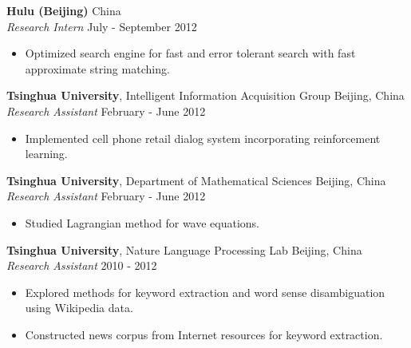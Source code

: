 \documentclass[a4paper,11pt]{article} %
\begin{document}
\textbf{Hulu (Beijing)} \hfill China \\
\textit{Research Intern} \hfill July - September 2012
\vspace{-.9\parskip}
\begin{itemize}
  \item Optimized search engine for fast and error tolerant search with fast approximate string matching.
\end{itemize}


\iffalse

\textbf{Tsinghua University}, Intelligent Information Acquisition Group \hfill Beijing, China \\
\textit{Research Assistant} \hfill February - June 2012
\vspace{-\parskip}
\begin{itemize}
  \item Implemented cell phone retail dialog system incorporating reinforcement learning.
\end{itemize}


\textbf{Tsinghua University}, Department of Mathematical Sciences \hfill Beijing, China \\
\textit{Research Assistant} \hfill February - June 2012
\vspace{-\parskip}
\begin{itemize}
  \item Studied Lagrangian method for wave equations.
\end{itemize}


\textbf{Tsinghua University}, Nature Language Processing Lab \hfill Beijing, China \\
\textit{Research Assistant} \hfill 2010 - 2012
\vspace{-\parskip}
\begin{itemize}
  \item Explored methods for keyword extraction and word sense disambiguation using Wikipedia data.
  \item Constructed news corpus from Internet resources for keyword extraction.
\end{itemize}

\end{document}
